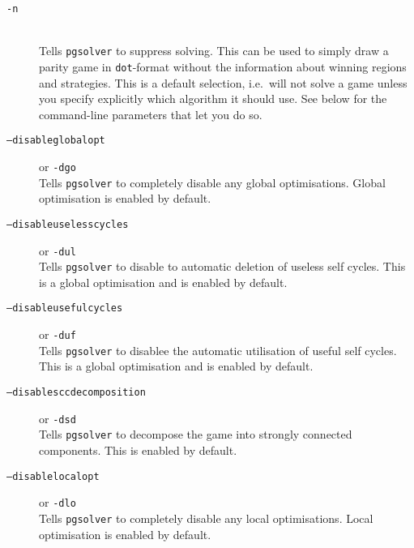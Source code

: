 \begin{description}


\item[{\tt -n}] \ \\
   Tells \texttt{pgsolver} to suppress solving. This can be used to simply draw a parity game in
   \texttt{dot}-format without the information about winning regions and strategies. This is a default
   selection, i.e.\ \pgsolver will not solve a game unless you specify explicitly which algorithm it
   should use. See below for the command-line parameters that let you do so.

\item[{\tt --disableglobalopt}]  \enspace or {\tt -dgo} \\
   Tells \texttt{pgsolver} to completely disable any global optimisations. Global optimisation is enabled by default.

\item[{\tt --disableuselesscycles}]  \enspace or {\tt -dul} \\
   Tells \texttt{pgsolver} to disable to automatic deletion of useless self cycles. This is a global optimisation and is enabled by default.

\item[{\tt --disableusefulcycles}]  \enspace or {\tt -duf} \\
   Tells \texttt{pgsolver} to disablee the automatic utilisation of useful self cycles. This is a global optimisation and is enabled by default.

\item[{\tt --disablesccdecomposition}]  \enspace or {\tt -dsd} \\
   Tells \texttt{pgsolver} to decompose the game into strongly connected components. This is enabled by default.

\item[{\tt --disablelocalopt}]  \enspace or {\tt -dlo} \\
   Tells \texttt{pgsolver} to completely disable any local optimisations. Local optimisation is enabled by default.


\end{description}

